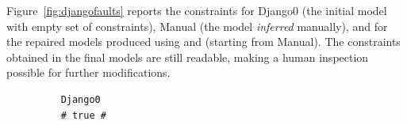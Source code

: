 \begin{tikzborder}{\cite{Gargantini16:validation}}
\begin{tikzborder}{\cite{gargantini_combinatorial_2017}}
Figure~\ref{fig:djangofaults} reports the constraints for \textsf{Django0} (the initial model with empty set of constraints), \textsf{Manual} (the model \emph{inferred} manually), and for the repaired models produced using \cucv and \ValC (starting from \textsf{Manual}). %
The constraints obtained in the final models are still readable, making a human inspection possible for further modifications.  \be


\begin{figure}[h]
	\begin{lstlisting}
	Django0
	# true #
	\end{lstlisting}

\end{figure}
\end{tikzborder}
\end{tikzborder}
